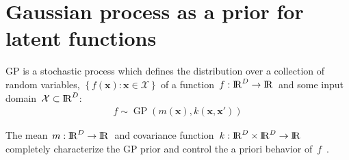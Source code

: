 \documentclass[portrait,a1,final]{a0poster} %
\let\tempone\itemize
\let\temptwo\enditemize
\renewenvironment{itemize}{\tempone\addtolength{\itemsep}{-0.3\baselineskip}}{\temptwo}
\DeclareMathOperator{\GP}{GP}
\begin{document}
\begin{minipage}{1\linewidth}
\begin{minipage}[t]{0.48\linewidth}
%
%
%


\vspace{-0.7cm}
\section{Gaussian process as a prior for latent functions}
\vspace{-0.2cm}

\begin{itemize}\setlength\itemsep{3mm}
\item GP is a {\color{navyblue} stochastic process} which defines the distribution over a collection of random variables, $\left\lbrace  f(\bm{x}): \bm{x} \in \mathcal{X}\right\rbrace$ of a function\, $f:{\rm I\!R}^D \to {\rm I\!R}$\, and some input domain\, $\mathcal{X} \subset {\rm I\!R}^D$:
%
\begin{align*}
f \sim \GP(m(\bm{x}), k(\bm{x}, \bm{x}'))
\end{align*}
%
\item The {\color{navyblue}mean}\, $m: {\rm I\!R}^D \to {\rm I\!R}$\, and {\color{navyblue}covariance function}\, $k: {\rm I\!R}^D \times {\rm I\!R}^D \to {\rm I\!R}$\, completely characterize the GP prior and control the a priori behavior of\, $f$\, \cite{rasmussen2006gaussian}.


\end{itemize}
\end{minipage}
\end{minipage}
\end{document}
